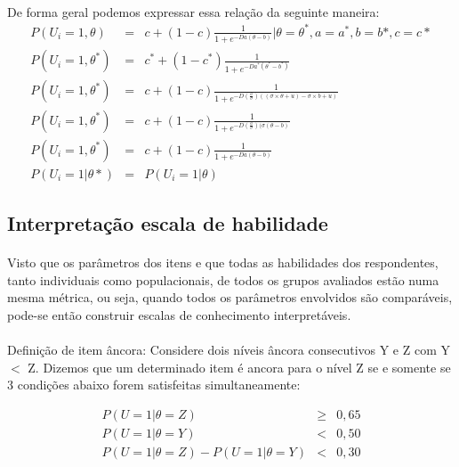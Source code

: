 	\paragraph{}
	    De forma geral podemos expressar essa relação da seguinte maneira:\\
	\begin{eqnarray}
		P(U_{i} = 1,\theta) & = & c + (1-c)\displaystyle\frac{1}{1 + e^{-Da(\theta - b)}} | \theta = \theta^*, a = a^*, b = b*, c = c* \nonumber\\ 
		P(U_{i} = 1,\theta^*) & = & c^* + (1-c^*)\displaystyle\frac{1}{1 + e^{-Da^*(\theta^* - b^*)}} \nonumber\\
		P(U_{i} = 1,\theta^*) & = & c + (1-c)\displaystyle\frac{1}{1 + e^{-D(\frac{a}{\sigma})((\sigma \times \theta + u) - \sigma \times b + u)}}\nonumber\\
		P(U_{i} = 1,\theta^*) & = & c + (1-c)\displaystyle\frac{1}{1 + e^{-D(\frac{a}{\sigma})(\sigma(\theta - b)}} \nonumber\\
		P(U_{i} = 1,\theta^*) & = & c + (1-c)\displaystyle\frac{1}{1 + e^{-Da(\theta - b)}} \nonumber\\
		P(U_i = 1|\theta*) & = & P(U_i = 1|\theta) \nonumber
	\end{eqnarray}
	\subsection{Interpretação escala de habilidade}
	\paragraph{}
	    Visto que os parâmetros dos itens e que todas as habilidades dos respondentes, tanto individuais como populacionais, de todos os grupos avaliados estão numa mesma métrica, ou seja, quando todos os parâmetros envolvidos são comparáveis, pode-se então construir escalas de conhecimento interpretáveis.
	\paragraph{}
	    Definição de item âncora: Considere dois níveis âncora consecutivos Y e Z com Y $<$ Z. Dizemos que um determinado item é ancora para o nível Z se e somente se 3 condições abaixo forem satisfeitas simultaneamente: 
	
	\begin{eqnarray}
		P(U = 1 | \theta = Z) & \geq & 0,65 \\
		P(U = 1 | \theta = Y) & < & 0,50  \\
		P(U = 1 | \theta = Z) - P(U = 1 | \theta = Y) & < & 0,30
	\end{eqnarray}

